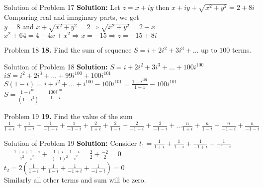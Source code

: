 \documentclass[aspectratio=169,8pt]{beamer}
\begin{document}
\begin{frame}{Solution of Problem 17}
  \textbf{Solution:} Let $z = x + iy$ then $x + iy + \sqrt{x^2 + y^2} = 2 + 8i$\\
  \vspace*{0.2cm}
  Comparing real and imaginary parts, we get\\
  \vspace*{0.2cm}
  $y = 8$ and $x + \sqrt{x^2 + y^2} = 2 \Rightarrow \sqrt{x^2 + y^2} = 2 - x$\\
  \vspace*{0.2cm}
  $x^2 + 64 = 4 - 4x + x^2 \Rightarrow x = -15\Rightarrow z = -15 + 8i$
\end{frame}
\begin{frame}{Problem 18}
  \textbf{18.} Find the sum of sequence $S = i + 2i^2 + 3i^3 + \ldots$ up to $100$ terms.
\end{frame}
\begin{frame}{Solution of Problem 18}
  \textbf{Solution:} $S = i + 2i^2 + 3i^3 +\ldots + 100i^{100}$\\
  \vspace*{0.2cm}
  $iS = i^2 + 2i^3 + \ldots + 99i^{100} + 100i^{101}$\\
  \vspace*{0.2cm}
  $S(1- i) = i + i^2 + \ldots + i^{100} - 100i^{101} = \frac{1 - i^{101}}{1 - 1} - 100i^{101}$\\
  \vspace*{0.2cm}
  $S = \frac{1 - i^{101}}{(1- i^2)} - \frac{100i^{101}}{1 - i}$
\end{frame}
\begin{frame}{Problem 19}
  \textbf{19.} Find the value of the sum $\frac{1}{1 + i} + \frac{1}{1 - i} + \frac{1}{-1 + i} + \frac{1}{-1 - i} + \frac{2}{1 + i} + \frac{2}{1 - i} + \frac{2}{-1 + i} + \frac{2}{-1 - i} + \ldots \frac{n}{1 + i} + \frac{n}{1 - i} + \frac{n}{-1 + i} + \frac{n}{-1 - i}$
\end{frame}
\begin{frame}{Solution of Problem 19}
  \textbf{Solution:} Consider $t_1 = \frac{1}{1 + i} + \frac{1}{1 - i} + \frac{1}{-1 + i} + \frac{1}{-1 - i}$\\
  \vspace*{0.2cm}
  $= \frac{1 + i + 1 - i}{1^2 - i^2} + \frac{-1 + i - 1 - i}{(-1)^2 - i^2} = \frac{2}{2} + \frac{-2}{2} = 0$\\
  \vspace*{0.2cm}
  $t_2 = 2\left(\frac{1}{1 + i} + \frac{1}{1 - i} + \frac{1}{-1 + i} + \frac{1}{-1 - i}\right) = 0$\\
  \vspace*{0.2cm}
  Similarly all other terms and sum will be zero.
\end{frame}
\end{document}
